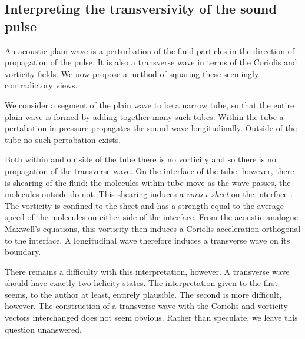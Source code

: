 
\subsection{Interpreting the transversivity of the sound pulse} \label{sec:transversivity}


An acoustic plain wave is  a  perturbation of the fluid particles in the direction of propagation of the pulse.
It is also a transverse wave in terms of the Coriolis and vorticity fields.
We now propose a method of squaring these seemingly contradictory views.

We consider a segment of the plain wave to be a narrow tube,
so that the entire plain wave is formed by adding together many such tubes.
Within the tube a pertabation in pressure propagates the sound wave longitudinally.
Outside of the tube no such pertabation exists.

Both within and outside of the tube  there is no vorticity and so there is no propagation of the transverse wave.
On the interface of the tube, however, there is shearing of the fluid:
the molecules  within tube move as the wave passes, the molecules outside do not.
This shearing induces a {\em vortex sheet} on the interface \cite{Howe1998}.
The vorticity is confined to the sheet 
and has a strength equal to the average speed of the molecules on either side of the interface.
From the acoustic analogue Maxwell's equations, this vorticity then induces a Coriolis acceleration orthogonal to the interface.
A longitudinal wave therefore  induces a transverse wave on its boundary.

There remains a difficulty with this interpretation, however.
A transverse wave should have exactly two helicity states.
The interpretation given to the first seems, to the author at least, entirely plausible.
The second is more difficult, however.
The construction of a transverse wave with the Coriolis and vorticity vectors interchanged does not seem obvious.
Rather than speculate, 
we leave this question unanswered.

